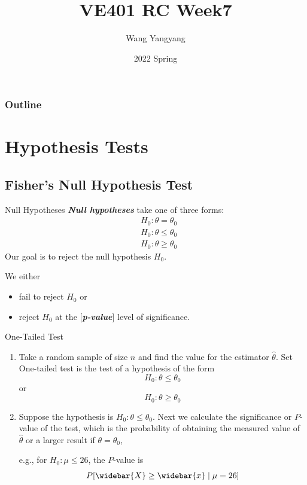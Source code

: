 \documentclass{beamer}
\title{VE401 RC Week7}
\author{Wang Yangyang}
\date{2022 Spring}
\institute{UM-SJTU JI}
\newcommand{\bb}[1]{\textcolor{antiquefuchsia}{\textbf{\textit{#1}}}}
\begin{document}
\maketitle

\begin{frame}
\frametitle{Outline}
\tableofcontents
\end{frame}



\section{Hypothesis Tests}
\subsection{Fisher's Null Hypothesis Test}
\begin{frame}{Null Hypotheses}
\bb{Null hypotheses} take one of three forms:
$$
\begin{aligned}
&H_{0}: \theta=\theta_{0} \\
&H_{0}: \theta \leq \theta_{0} \\
&H_{0}: \theta \geq \theta_{0}
\end{aligned}
$$
Our goal is to reject the null hypothesis $H_{0}$.

We either
\begin{itemize}
\item fail to reject $H_{0}$ or
\item reject $H_{0}$ at the [\bb{p-value}] level of significance.
\end{itemize}

\end{frame}

\begin{frame}{One-Tailed Test}
\begin{enumerate}
\item Take a random sample of size $n$ and find the value for the estimator $\widehat{\theta}$. Set One-tailed test is the test of a hypothesis of the form
$$
H_{0}: \theta \leq \theta_{0}
$$
or
$$
H_{0}: \theta \geq \theta_{0}
$$
\item Suppose the hypothesis is $H_{0}: \theta \leq \theta_{0}$. Next we calculate the significance or $P$-value of the test, which is the probability of obtaining the measured value of $\widehat{\theta}$ or a larger result if $\theta=\theta_{0}$,

e.g., for $H_{0}: \mu \leq 26$, the $P$-value is
$$
P[\widebar{X} \geq \widebar{x} \mid \mu=26]
$$
\end{enumerate}
\end{frame}
\end{document}
